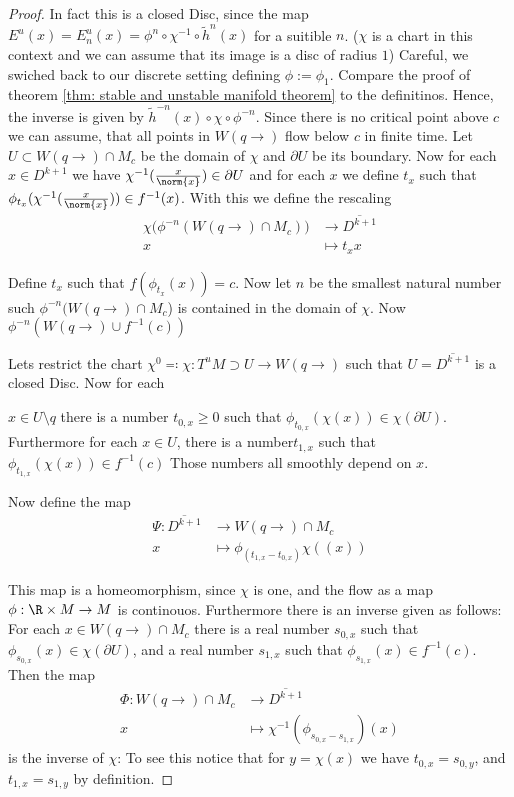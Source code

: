 \begin{proof}
In fact this is a closed Disc, since the map $E^u(x)=E^u_n(x)=\phi^n\circ \chi^{-1} \circ \tilde{h}^n(x)$ for a suitible $n$. ($\chi$ is a chart in this context and we can assume that its image is a disc of radius $1$) Careful, we swiched back to our discrete setting defining $\phi:=\phi_1$. Compare the proof of theorem \ref{thm: stable and unstable manifold theorem} to the definitinos. Hence, the inverse is given by $\tilde{h}^{-n}(x)\circ \chi \circ \phi^{-n}$. Since there is no critical point above $c$ we can assume, that all points in $W(q\to)$ flow below $c$ in finite time. 
Let $U\subset W(q\to)\cap M_c$ be the domain of $\chi$ and $\partial U$ be its boundary. Now for each $x\in D^{k+1}$ we have $\chi^{-1}(\frac{x}{\norm{x}})\in \partial U$ and for each $x$ we  define $t_x$ such that $\phi_{t_x}(\chi^{-1}(\frac{x}{\norm{x}}))\in f^{-1}(x)$. With this we define the rescaling
\begin{align*}
	\chi\big( \phi^{-n}(W(q\to)\cap M_c)\big) & \to 	 \overline{D^{k+1}}\\
	x										  & \mapsto  t_{x}x
\end{align*}

Define $t_x$ such that $f(\phi_{t_x}(x))=c$. Now let $n$ be the smallest natural number such $\phi^{-n}(W(q\to )\cap M_c$) is contained in the domain of $\chi$. Now $\phi^{-n}(W(q\to)\cup f^{-1}(c))$

Lets restrict the chart $\chi^0 \eqcolon \chi:T^uM\supset U\to W(q\to)$ such that $U=\overline{D^{k+1}}$ is a closed Disc. Now for each 

$x\in  U\setminus q$ there is a number $t_{0,x}\geq 0$ such that $\phi_{t_{0,x}}(\chi(x))\in \chi(\partial U)$. Furthermore for each $x\in  U$, there is a number$t_{1,x}$ such that $\phi_{t_{1,x}}(\chi(x))\in f^{-1}(c)$ Those numbers all smoothly depend on $x$.



 Now define the map
\begin{align*}
\Psi:	\overline {D^{k+1}}			&\to 		W(q\to)\cap M_c\\
	x				&\mapsto	\phi_{(t_{1,x}-t_{0,x})}\chi((x))
\end{align*}





This map is a homeomorphism, since $\chi$ is one, and the flow as a map $\phi: \R \times M \to M$ is continouos. Furthermore there is an inverse given as follows: For each $x\in W(q\to)\cap M_c$ there is a real number $s_{0,x}$ such that $\phi_{s_{0,x}}(x)\in \chi(\partial U)$, and a real number $s_{1,x}$ such that $\phi_{s_{1,x}}(x)\in f^{-1}(c)$. Then the map 
\begin{align*}
\Phi: W(q\to)\cap M_c 	&\to     \overline {D^{k+1}} \\
x						&\mapsto \chi^{-1}(\phi_{s_{0,x}-s_{1,x}})(x)
\end{align*}
is the inverse of $\chi$: To see this notice that for $y=\chi(x)$ we have $t_{0,x}=s_{0,y}$, and $t_{1,x}=s_{1,y}$ by definition. 




\end{proof}
